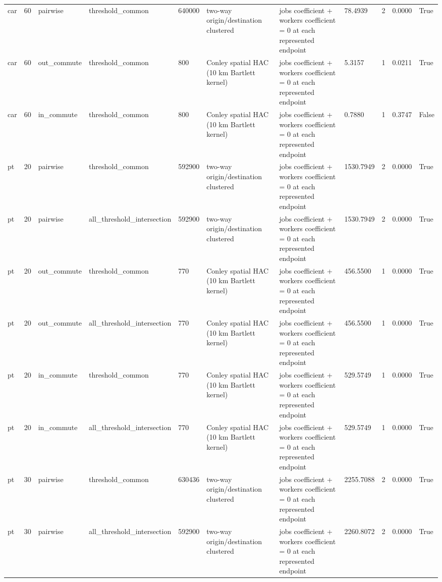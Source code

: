 \begin{table}[htbp]
\begin{tabular}{lllllllllll}
car & 60 & pairwise & threshold\_common & 640000 & two-way origin/destination clustered & jobs coefficient + workers coefficient = 0 at each represented endpoint & 78.4939 & 2 & 0.0000 & True \\
car & 60 & out\_commute & threshold\_common & 800 & Conley spatial HAC (10 km Bartlett kernel) & jobs coefficient + workers coefficient = 0 at each represented endpoint & 5.3157 & 1 & 0.0211 & True \\
car & 60 & in\_commute & threshold\_common & 800 & Conley spatial HAC (10 km Bartlett kernel) & jobs coefficient + workers coefficient = 0 at each represented endpoint & 0.7880 & 1 & 0.3747 & False \\
pt & 20 & pairwise & threshold\_common & 592900 & two-way origin/destination clustered & jobs coefficient + workers coefficient = 0 at each represented endpoint & 1530.7949 & 2 & 0.0000 & True \\
pt & 20 & pairwise & all\_threshold\_intersection & 592900 & two-way origin/destination clustered & jobs coefficient + workers coefficient = 0 at each represented endpoint & 1530.7949 & 2 & 0.0000 & True \\
pt & 20 & out\_commute & threshold\_common & 770 & Conley spatial HAC (10 km Bartlett kernel) & jobs coefficient + workers coefficient = 0 at each represented endpoint & 456.5500 & 1 & 0.0000 & True \\
pt & 20 & out\_commute & all\_threshold\_intersection & 770 & Conley spatial HAC (10 km Bartlett kernel) & jobs coefficient + workers coefficient = 0 at each represented endpoint & 456.5500 & 1 & 0.0000 & True \\
pt & 20 & in\_commute & threshold\_common & 770 & Conley spatial HAC (10 km Bartlett kernel) & jobs coefficient + workers coefficient = 0 at each represented endpoint & 529.5749 & 1 & 0.0000 & True \\
pt & 20 & in\_commute & all\_threshold\_intersection & 770 & Conley spatial HAC (10 km Bartlett kernel) & jobs coefficient + workers coefficient = 0 at each represented endpoint & 529.5749 & 1 & 0.0000 & True \\
pt & 30 & pairwise & threshold\_common & 630436 & two-way origin/destination clustered & jobs coefficient + workers coefficient = 0 at each represented endpoint & 2255.7088 & 2 & 0.0000 & True \\
pt & 30 & pairwise & all\_threshold\_intersection & 592900 & two-way origin/destination clustered & jobs coefficient + workers coefficient = 0 at each represented endpoint & 2260.8072 & 2 & 0.0000 & True \\

\end{tabular}
\end{table}
